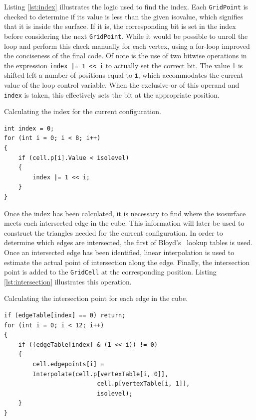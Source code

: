 \documentclass[pageno]{jpaper}
\begin{document}
Listing \ref{lst:index} illustrates the logic used to find the index. Each \texttt{GridPoint} is checked to determine if its value is less than the given isovalue, which signifies that it is inside the surface. If it is, the corresponding bit is set in the index before considering the next \texttt{GridPoint}. While it would be possible to unroll the loop and perform this check manually for each vertex, using a for-loop improved the conciseness of the final code. Of note is the use of two bitwise operations in the expression \texttt{index |= 1 << i} to actually set the correct bit. The value 1 is shifted left a number of positions equal to \texttt{i}, which accommodates the current value of the loop control variable. When the exclusive-or of this operand and \texttt{index} is taken, this effectively sets the bit at the appropriate position.

\begin{listing}[H]
\linespread{1.0}
\caption{Calculating the index for the current configuration.}
\begin{verbatim}
int index = 0;
for (int i = 0; i < 8; i++)
{
    if (cell.p[i].Value < isolevel)
    {
        index |= 1 << i;
    }
}
\end{verbatim}
\label{lst:index}
\end{listing}

Once the index has been calculated, it is necessary to find where the isosurface meets each intersected edge in the cube. This information will later be used to construct the triangles needed for the current configuration. In order to determine which edges are intersected, the first of Bloyd's~\cite{bloyd} lookup tables is used. Once an intersected edge has been identified, linear interpolation is used to estimate the actual point of intersection along the edge. Finally, the intersection point is added to the \texttt{GridCell} at the corresponding position. Listing \ref{lst:intersection} illustrates this operation.

\begin{listing}[H]
\linespread{1.0}
\caption{Calculating the intersection point for each edge in the cube.}
\begin{verbatim}
if (edgeTable[index] == 0) return;
for (int i = 0; i < 12; i++)
{
    if ((edgeTable[index] & (1 << i)) != 0)
    {
        cell.edgepoints[i] = 
        Interpolate(cell.p[vertexTable[i, 0]], 
                          cell.p[vertexTable[i, 1]], 
                          isolevel);
    }
}
\end{verbatim}
\label{lst:intersection}
\end{listing}
\end{document}
